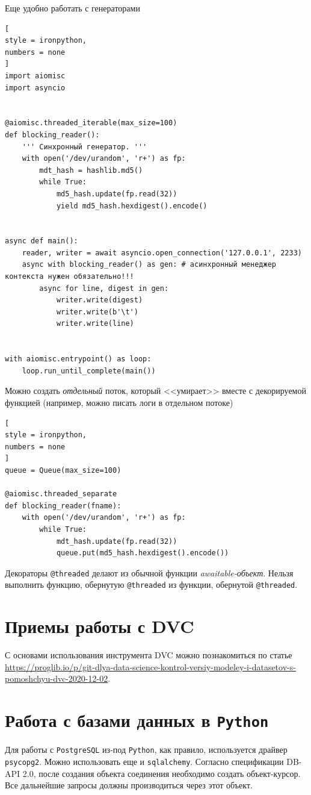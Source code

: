\documentclass[%
	11pt,
	a4paper,
	utf8,
		]{article}
\begin{document}
Еще удобно работать с генераторами
\begin{lstlisting}[
style = ironpython,
numbers = none
]
import aiomisc
import asyncio


@aiomisc.threaded_iterable(max_size=100)
def blocking_reader():
    ''' Синхронный генератор. '''
    with open('/dev/urandom', 'r+') as fp:
        mdt_hash = hashlib.md5()
        while True:
            md5_hash.update(fp.read(32))
            yield md5_hash.hexdigest().encode()


async def main():
    reader, writer = await asyncio.open_connection('127.0.0.1', 2233)
    async with blocking_reader() as gen: # асинхронный менеджер контекста нужен обязательно!!!
        async for line, digest in gen:
            writer.write(digest)
            writer.write(b'\t')
            writer.write(line)


with aiomisc.entrypoint() as loop:
    loop.run_until_complete(main())
\end{lstlisting}

Можно создать \emph{отдельный} поток, который <<умирает>> вместе с декорируемой функцией (например, можно писать логи в отдельном потоке)
\begin{lstlisting}[
style = ironpython,
numbers = none
]
queue = Queue(max_size=100)

@aiomisc.threaded_separate
def blocking_reader(fname):
    with open('/dev/urandom', 'r+') as fp:
        while True:
            mdt_hash.update(fp.read(32))
            queue.put(md5_hash.hexdigest().encode())
\end{lstlisting}

Декораторы \verb|@threaded| делают из обычной функции \emph{awaitable-объект}. Нельзя выполнить функцию, обернутую \verb|@threaded| из функции, обернутой \verb|@threaded|.

\section{Приемы работы с DVC}

С основами использования инструмента DVC можно познакомиться по статье \url{https://proglib.io/p/git-dlya-data-science-kontrol-versiy-modeley-i-datasetov-s-pomoshchyu-dvc-2020-12-02}.

\section{Работа с базами данных в \texttt{Python}}

Для работы с \texttt{PostgreSQL} из-под \texttt{Python}, как правило, используется драйвер \texttt{psycopg2}. Можно использовать еще и \texttt{sqlalchemy}. Согласно спецификации DB-API 2.0, после создания объекта соединения необходимо создать объект-курсор. Все дальнейшие запросы должны производиться через этот объект.
\end{document}
